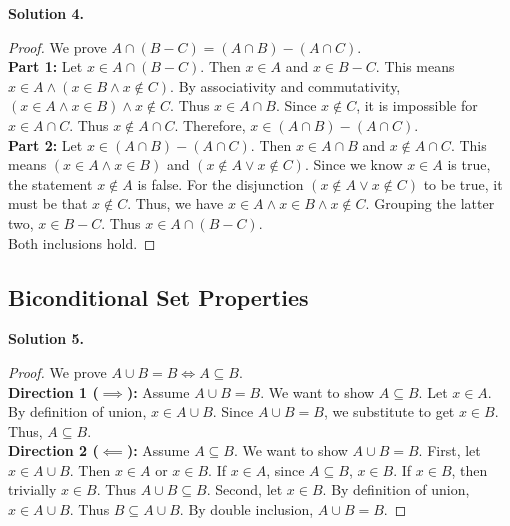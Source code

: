 \documentclass[11pt]{article}
\begin{document}
\noindent \textbf{Solution 4.}
\begin{proof}
We prove $A \cap (B - C) = (A \cap B) - (A \cap C)$. \\
\textbf{Part 1:} Let $x \in A \cap (B - C)$. Then $x \in A$ and $x \in B - C$. This means $x \in A \land (x \in B \land x \notin C)$. By associativity and commutativity, $(x \in A \land x \in B) \land x \notin C$. Thus $x \in A \cap B$. Since $x \notin C$, it is impossible for $x \in A \cap C$. Thus $x \notin A \cap C$. Therefore, $x \in (A \cap B) - (A \cap C)$. \\
\textbf{Part 2:} Let $x \in (A \cap B) - (A \cap C)$. Then $x \in A \cap B$ and $x \notin A \cap C$. This means $(x \in A \land x \in B)$ and $(x \notin A \lor x \notin C)$. Since we know $x \in A$ is true, the statement $x \notin A$ is false. For the disjunction $(x \notin A \lor x \notin C)$ to be true, it must be that $x \notin C$. Thus, we have $x \in A \land x \in B \land x \notin C$. Grouping the latter two, $x \in B - C$. Thus $x \in A \cap (B - C)$. \\
Both inclusions hold.
\end{proof}

\subsection{Biconditional Set Properties}

\noindent \textbf{Solution 5.}
\begin{proof}
We prove $A \cup B = B \iff A \subseteq B$. \\
\textbf{Direction 1 ($\implies$):} Assume $A \cup B = B$. We want to show $A \subseteq B$. Let $x \in A$. By definition of union, $x \in A \cup B$. Since $A \cup B = B$, we substitute to get $x \in B$. Thus, $A \subseteq B$. \\
\textbf{Direction 2 ($\impliedby$):} Assume $A \subseteq B$. We want to show $A \cup B = B$. 
First, let $x \in A \cup B$. Then $x \in A$ or $x \in B$. If $x \in A$, since $A \subseteq B$, $x \in B$. If $x \in B$, then trivially $x \in B$. Thus $A \cup B \subseteq B$. 
Second, let $x \in B$. By definition of union, $x \in A \cup B$. Thus $B \subseteq A \cup B$. 
By double inclusion, $A \cup B = B$.
\end{proof}
\end{document}
